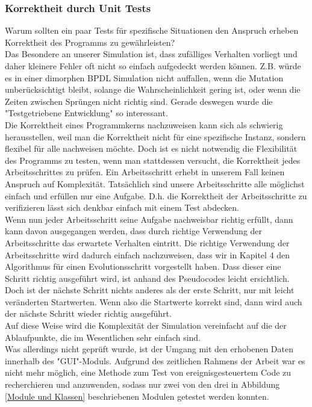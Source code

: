 \documentclass[11pt, a4paper, german]{article}
\theoremstyle{plain}
\begin{document}
	\subsubsection{Korrektheit durch Unit Tests}
	Warum sollten ein paar Tests für spezifische Situationen den Anspruch erheben Korrektheit des Programms zu gewährleisten?\\
	Das Besondere an unserer Simulation ist, dass zufälliges Verhalten vorliegt und daher kleinere Fehler oft nicht so einfach aufgedeckt werden können. Z.B. würde es in einer dimorphen BPDL Simulation nicht auffallen, wenn die Mutation unberücksichtigt bleibt, solange die Wahrscheinlichkeit gering ist, oder wenn die Zeiten zwischen Sprüngen nicht richtig sind. Gerade deswegen wurde die "{}Testgetriebene Entwicklung"{} so interessant.\\
	Die Korrektheit eines Programmkerns nachzuweisen kann sich als schwierig herausstellen, weil man die Korrektheit nicht für eine spezifische Instanz, sondern flexibel für alle nachweisen möchte. Doch ist es nicht notwendig die Flexibilität des Programms zu testen, wenn man stattdessen versucht, die Korrektheit jedes Arbeitsschrittes zu prüfen. Ein Arbeitsschritt erhebt in unserem Fall keinen Anspruch auf Komplexität. Tatsächlich sind unsere Arbeitsschritte alle möglichst einfach und erfüllen nur eine Aufgabe. D.h. die Korrektheit der Arbeitsschritte zu verifizieren lässt sich denkbar einfach mit einem Test abdecken.\\
	Wenn nun jeder Arbeitsschritt seine Aufgabe nachweisbar richtig erfüllt, dann kann davon ausgegangen werden, dass durch richtige Verwendung der Arbeitsschritte das erwartete Verhalten eintritt. Die richtige Verwendung der Arbeitsschritte wird dadurch einfach nachzuweisen, dass wir in Kapitel 4 den Algorithmus für einen Evolutionsschritt vorgestellt haben. Dass dieser eine Schritt richtig ausgeführt wird, ist anhand des Pseudocodes leicht ersichtlich. Doch ist der nächste Schritt nichts anderes als der erste Schritt, nur mit leicht veränderten Startwerten. Wenn also die Startwerte korrekt sind, dann wird auch der nächste Schritt wieder richtig ausgeführt.\\
	Auf diese Weise wird die Komplexität der Simulation vereinfacht auf die der Ablaufpunkte, die im Wesentlichen sehr einfach sind.\\
	Was allerdings nicht geprüft wurde, ist der Umgang mit den erhobenen Daten innerhalb des "{}GUI"{}-Moduls. Aufgrund des zeitlichen Rahmens der Arbeit war es nicht mehr möglich, eine Methode zum Test von ereignisgesteuertem Code zu recherchieren und anzuwenden, sodass nur zwei von den drei in Abbildung \ref{Module und Klassen} beschriebenen Modulen getestet werden konnten.
\end{document}
